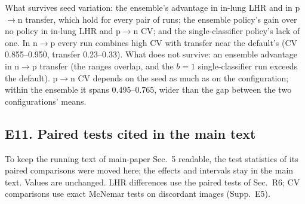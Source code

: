 What survives seed variation: the ensemble's advantage in in-lung LHR and in p$\to$n transfer, which hold for every pair of runs; the ensemble policy's gain over no policy in in-lung LHR and p$\to$n CV; and the single-classifier policy's lack of one. In n$\to$p every run combines high CV with transfer near the default's (CV 0.855--0.950, transfer 0.23--0.33). What does not survive: an ensemble advantage in n$\to$p transfer (the ranges overlap, and the $b=1$ single-classifier run exceeds the default). p$\to$n CV depends on the seed as much as on the configuration; within the ensemble it spans 0.495--0.765, wider than the gap between the two configurations' means.

\subsection*{E11. Paired tests cited in the main text}
\label{sec:suppl-paired-tests}

To keep the running text of main-paper Sec.~5 readable, the test statistics of its paired comparisons were moved here; the effects and intervals stay in the main text. Values are unchanged. LHR differences use the paired tests of Sec.~R6; CV comparisons use exact McNemar tests on discordant images (Supp.~E5).

